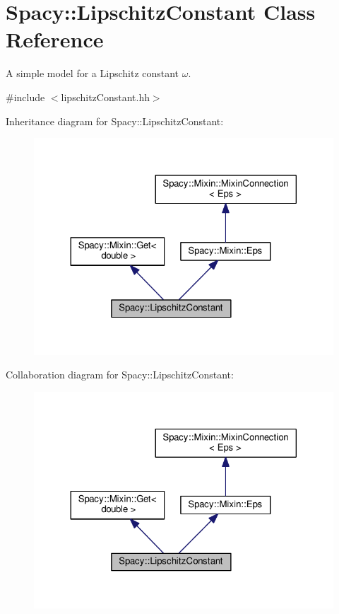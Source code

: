 \hypertarget{classSpacy_1_1LipschitzConstant}{}\section{Spacy\+:\+:Lipschitz\+Constant Class Reference}
\label{classSpacy_1_1LipschitzConstant}


A simple model for a Lipschitz constant $\omega$.  




{\ttfamily \#include $<$lipschitz\+Constant.\+hh$>$}



Inheritance diagram for Spacy\+:\+:Lipschitz\+Constant\+:
\nopagebreak
\begin{figure}[H]
\begin{center}
\leavevmode
\includegraphics[width=324pt]{classSpacy_1_1LipschitzConstant__inherit__graph}
\end{center}
\end{figure}


Collaboration diagram for Spacy\+:\+:Lipschitz\+Constant\+:
\nopagebreak
\begin{figure}[H]
\begin{center}
\leavevmode
\includegraphics[width=324pt]{classSpacy_1_1LipschitzConstant__coll__graph}
\end{center}
\end{figure}
